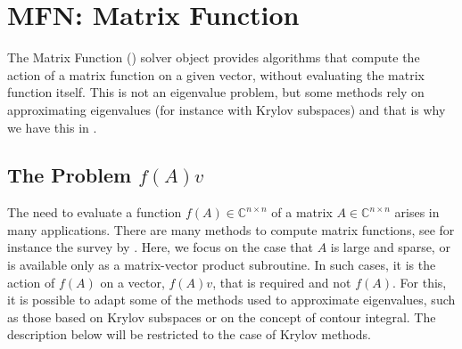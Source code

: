 \chapter{\label{cap:mfn}MFN: Matrix Function}

\begin{center}
  {\setlength{\fboxsep}{4mm}
  }
\end{center}

\noindent The Matrix Function () solver object provides algorithms that compute the action of a matrix function on a given vector, without evaluating the matrix function itself. This is not an eigenvalue problem, but some methods rely on approximating eigenvalues (for instance with Krylov subspaces) and that is why we have this in \slepc.

\section{\label{sec:mfn}The Problem $f(A)v$}

The need to evaluate a function $f(A)\in\mathbb{C}^{n\times n}$ of a matrix $A\in\mathbb{C}^{n\times n}$ arises in many applications. There are many methods to compute matrix functions, see for instance the survey by \cite{Higham:2010:CMF}.
Here, we focus on the case that $A$ is large and sparse, or is available only as a matrix-vector product subroutine. In such cases, it is the action of $f(A)$ on a vector, $f(A)v$, that is required and not $f(A)$. For this, it is possible to adapt some of the methods used to approximate eigenvalues, such as those based on Krylov subspaces or on the concept of contour integral. The description below will be restricted to the case of Krylov methods.

